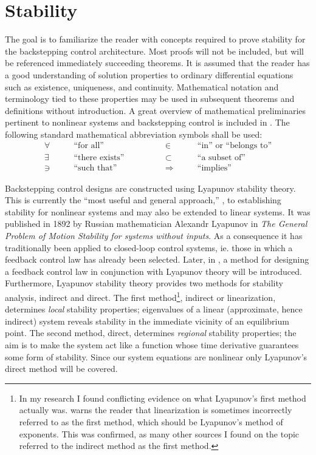 \documentclass[12pt]{ucthesis}
\begin{document}
\section{Stability}
\label{sec: stability}
%
The goal is to familiarize the reader with concepts required to prove stability for the backstepping control architecture. Most proofs will not be included, but will be referenced immediately succeeding theorems. It is assumed that the reader has a good understanding of solution properties to ordinary differential equations such as existence, uniqueness, and continuity. Mathematical notation and terminology tied to these properties may be used in subsequent theorems and definitions without introduction. A great overview of mathematical preliminaries pertinent to nonlinear systems and backstepping control is included in \citet[Chp. 2]{Khalil1996}. The following standard mathematical abbreviation symbols shall be used:
\begin{align*}
	\forall 	\quad & \quad \text{``for all''} 		\qquad & \qquad 	\in 		\quad & \quad \text{``in'' or ``belongs to''}	\\
	\exists 	\quad & \quad \text{``there exists''}	\qquad & \qquad		\subset		\quad & \quad \text{``a subset of''}			\\
	\ni 		\quad & \quad \text{``such that''}		\qquad & \qquad		\Rightarrow \quad & \quad \text{``implies''}
\end{align*}

Backstepping control designs are constructed using Lyapunov stability theory. This is currently the ``most useful and general approach,'' \citet{Slotine1991}, to establishing stability for nonlinear systems and may also be extended to linear systems. It was published in 1892 by Russian mathematician Alexandr Lyapunov in \textit{The General Problem of Motion Stability} \textit{for systems without inputs}. As a consequence it has traditionally been applied to closed-loop control systems, ie. those in which a feedback control law has already been selected. Later, in , a method for designing a feedback control law in conjunction with Lyapunov theory will be introduced. Furthermore, Lyapunov stability theory provides two methods for stability analysis, indirect and direct. The first method\footnote{In my research I found conflicting evidence on what Lyapunov's first method actually was. \citep{Slotine1991} warns the reader that linearization is sometimes incorrectly referred to as the first method, which should be Lyapunov's method of exponents. This was confirmed, as many other sources I found on the topic referred to the indirect method as the first method.}, indirect or linearization, determines \textit{local} stability properties; eigenvalues of a linear (approximate, hence indirect) system reveals stability in the immediate vicinity of an equilibrium point. The second method, direct, determines \textit{regional} stability properties; the aim is to make the system act like a function whose time derivative guarantees some form of stability. Since our system equations are nonlinear only Lyapunov's direct method will be covered.
\end{document}
